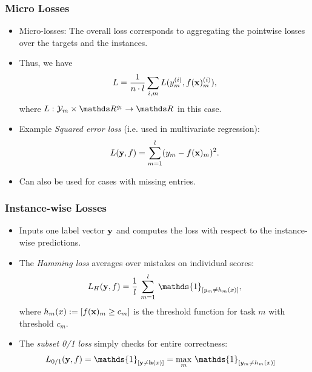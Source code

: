 \documentclass[11pt,compress,t,notes=noshow, xcolor=table]{beamer}
\begin{document}
\begin{frame}
	\frametitle{Micro Losses}
	\begin{itemize}
		

            \item Micro-losses: The overall loss corresponds to aggregating the pointwise losses over the targets and the instances.
                    \vspace{5pt}

            \item Thus, we have	
	$$
	L =  \frac{1}{n \cdot l} \sum_{i,m} L(y_m^{(i)} , f(\mathbf{x})_m^{(i)}),
	$$
	where $L: \Yspace_m \times \R^{g_l} \to \R$ in this case.
                    \vspace{5pt}            
		\item Example \emph{Squared error loss} (i.e. used in multivariate regression):
		$$
		L(\mathbf{y}, f) = \sum_{m=1}^l (y_m - f(\mathbf{x})_m)^2.
		$$
            \item Can also be used for cases with missing entries.

		
	\end{itemize}
\end{frame}

\begin{frame}
	\frametitle{Instance-wise Losses}
	\begin{itemize}
		
            \item Inputs one label vector $\mathbf{y}$ and computes the loss with respect to the instance-wise predictions.
                    \vspace{5pt}            

		\item The \emph{Hamming loss} averages over mistakes on individual scores:    
		$$
		\displaystyle L_H(\yv, f) = \frac{1}{l}  \, \sum_{m=1}^l \, \mathds{1}_{[y_m \neq h_m(x)]},
		$$
        where $h_m(x) := [f(\mathbf{x})_m \geq c_m]$ is the threshold function for task $m$ with threshold $c_m$.
        \vspace{5pt}
		
		\item The \emph{subset 0/1 loss} simply checks for entire correctness:  
		\begin{align*}
			\displaystyle L_{0/1}(\yv, f) & = \mathds{1}_{[ \yv \neq \mathbf{h}(x) ]}  =  \max_m \, \mathds{1}_{[y_m \neq  h_m(x)]}
		\end{align*}
		
	\end{itemize}
\end{frame}
\end{document}
